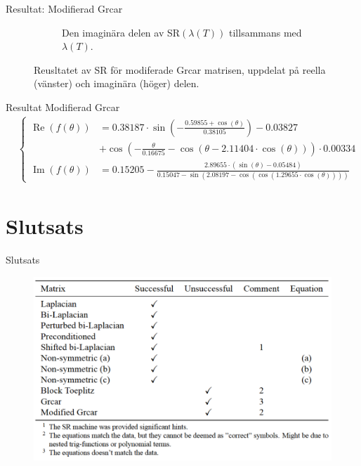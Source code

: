 \documentclass{beamer}
\begin{document}
\begin{frame}{Resultat: Modifierad Grcar}
\begin{figure}[H]
\begin{subfigure}{0.49\textwidth}
        \caption{Den imaginära delen av SR$(\lambda(T))$ tillsammans med $\lambda(T)$.}
        \label{fig:Mres2_im}
    \end{subfigure}
    \caption{Reusltatet av SR för modiferade Grcar matrisen, uppdelat på reella (vänster) och imaginära (höger) delen.}
    \label{fig:Mres2}
    \end{figure}
\end{frame}

\begin{frame}{Resultat Modifierad Grcar}
\begin{align}
    &\begin{cases}
        \operatorname{Re}(f(\theta)) &=  0.38187 \cdot \sin\left( -\frac{0.59855 + \cos(\theta)}{0.38105} \right) - 0.03827\\
        &+  \cos\left( -\frac{\theta}{0.16675} - \cos\left( \theta -  2.11404 \cdot \cos(\theta) \right)  \right) \cdot 0.00334  
        \\
        \operatorname{Im}(f(\theta)) &= 0.15205 - \frac{2.89655 \cdot (\sin(\theta)-0.05484  )}{0.15047 - \sin(2.08197 - \cos(\cos(1.29655 \cdot \cos(\theta))))}
    \end{cases}
\label{eq:mod_g_2}
\end{align}
\end{frame}

\section{Slutsats}

\begin{frame}{Slutsats}
\begin{figure}
    \centering
    \includegraphics[width=0.9\linewidth]{images/BILD_AV_TABELL2.png}
    \caption{}
    \label{fig:enter-label}
\end{figure}
\end{frame}

\end{document}
